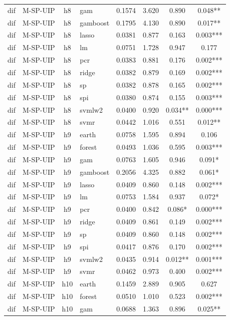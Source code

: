 \begin{ThreePartTable}
\begin{longtable}[t]{llclcccc}
dif & M-SP-UIP & h8 & gam & 0.1574 & 3.620 & 0.890 & 0.048**\\
dif & M-SP-UIP & h8 & gamboost & 0.1795 & 4.130 & 0.890 & 0.017**\\
dif & M-SP-UIP & h8 & lasso & 0.0381 & 0.877 & 0.163 & 0.003***\\
dif & M-SP-UIP & h8 & lm & 0.0751 & 1.728 & 0.947 & 0.177\\
dif & M-SP-UIP & h8 & pcr & 0.0383 & 0.881 & 0.176 & 0.002***\\
dif & M-SP-UIP & h8 & ridge & 0.0382 & 0.879 & 0.169 & 0.002***\\
dif & M-SP-UIP & h8 & sp & 0.0382 & 0.878 & 0.165 & 0.002***\\
dif & M-SP-UIP & h8 & spi & 0.0380 & 0.874 & 0.155 & 0.003***\\
dif & M-SP-UIP & h8 & svmlw2 & 0.0400 & 0.920 & 0.034** & 0.000***\\
dif & M-SP-UIP & h8 & svmr & 0.0442 & 1.016 & 0.551 & 0.012**\\
\addlinespace
dif & M-SP-UIP & h9 & earth & 0.0758 & 1.595 & 0.894 & 0.106\\
dif & M-SP-UIP & h9 & forest & 0.0493 & 1.036 & 0.595 & 0.003***\\
dif & M-SP-UIP & h9 & gam & 0.0763 & 1.605 & 0.946 & 0.091*\\
dif & M-SP-UIP & h9 & gamboost & 0.2056 & 4.325 & 0.882 & 0.061*\\
dif & M-SP-UIP & h9 & lasso & 0.0409 & 0.860 & 0.148 & 0.002***\\
dif & M-SP-UIP & h9 & lm & 0.0753 & 1.584 & 0.937 & 0.072*\\
dif & M-SP-UIP & h9 & pcr & 0.0400 & 0.842 & 0.086* & 0.000***\\
dif & M-SP-UIP & h9 & ridge & 0.0409 & 0.861 & 0.149 & 0.002***\\
dif & M-SP-UIP & h9 & sp & 0.0409 & 0.860 & 0.148 & 0.002***\\
dif & M-SP-UIP & h9 & spi & 0.0417 & 0.876 & 0.170 & 0.002***\\
dif & M-SP-UIP & h9 & svmlw2 & 0.0435 & 0.914 & 0.012** & 0.001***\\
dif & M-SP-UIP & h9 & svmr & 0.0462 & 0.973 & 0.400 & 0.002***\\
\addlinespace
dif & M-SP-UIP & h10 & earth & 0.1459 & 2.889 & 0.905 & 0.627\\
dif & M-SP-UIP & h10 & forest & 0.0510 & 1.010 & 0.523 & 0.002***\\
dif & M-SP-UIP & h10 & gam & 0.0688 & 1.363 & 0.896 & 0.025**\\

\end{longtable}
\end{ThreePartTable}
